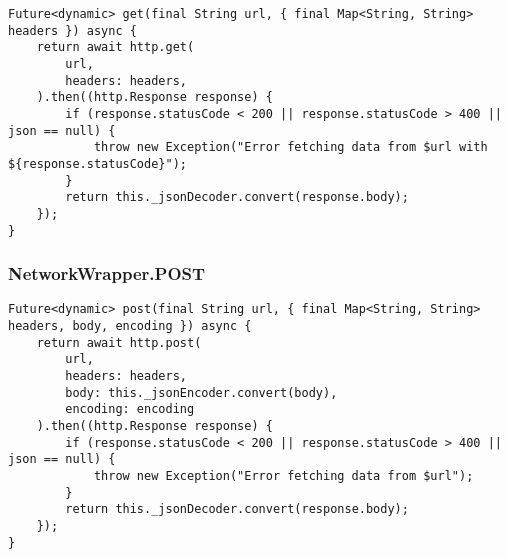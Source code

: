 \begin{lstlisting}
Future<dynamic> get(final String url, { final Map<String, String> headers }) async {
    return await http.get(
        url,
        headers: headers,
    ).then((http.Response response) {
        if (response.statusCode < 200 || response.statusCode > 400 || json == null) {
            throw new Exception("Error fetching data from $url with ${response.statusCode}");
        }
        return this._jsonDecoder.convert(response.body);
    });
}
\end{lstlisting}

\subsubsection{NetworkWrapper.POST}

\begin{lstlisting}
Future<dynamic> post(final String url, { final Map<String, String> headers, body, encoding }) async {
    return await http.post(
        url,
        headers: headers,
        body: this._jsonEncoder.convert(body),
        encoding: encoding
    ).then((http.Response response) {
        if (response.statusCode < 200 || response.statusCode > 400 || json == null) {
            throw new Exception("Error fetching data from $url");
        }
        return this._jsonDecoder.convert(response.body);
    });
}
\end{lstlisting}